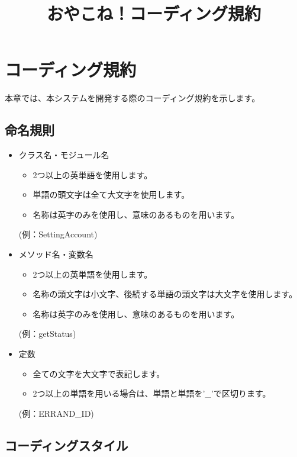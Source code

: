\documentclass[a4j]{jarticle}
\title{
\vspace{5mm}
{\bf おやこね！コーディング規約}
\date{}
}
\begin{document}
\maketitle
\section{コーディング規約}
本章では、本システムを開発する際のコーディング規約を示します。

\subsection{命名規則}
\begin{itemize}
  \item クラス名・モジュール名
  \begin{itemize}
    \item 2つ以上の英単語を使用します。
    \item 単語の頭文字は全て大文字を使用します。
    \item 名称は英字のみを使用し、意味のあるものを用います。
  \end{itemize}
  (例：SettingAccount)

  \item メソッド名・変数名
  \begin{itemize}
    \item 2つ以上の英単語を使用します。
    \item 名称の頭文字は小文字、後続する単語の頭文字は大文字を使用します。
    \item 名称は英字のみを使用し、意味のあるものを用います。
  \end{itemize}
  (例：getStatus)

  \item 定数
  \begin{itemize}
    \item 全ての文字を大文字で表記します。
    \item 2つ以上の単語を用いる場合は、単語と単語を'\_'で区切ります。
  \end{itemize}
  (例：ERRAND\_ID)
\end{itemize}

\subsection{コーディングスタイル}
\end{document}
